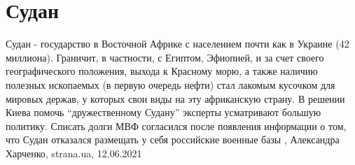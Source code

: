  
 
 
 
 
\chapter{Судан}
\label{sec:slova.sudan}

Судан - государство в Восточной Африке с населением почти как в Украине (42
миллиона). Граничит, в частности, с Египтом, Эфиопией, и за счет своего
географического положения, выхода к Красному морю, а также наличию полезных
ископаемых (в первую очередь нефти) стал лакомым кусочком для мировых держав, у
которых свои виды на эту африканскую страну.  В решении Киева помочь
\enquote{дружественному Судану} эксперты усматривают большую политику. Списать долги
МВФ согласился после появления информации о том, что Судан отказался размещать
у себя российские военные базы
, 
Александра Харченко, strana.ua, 12.06.2021

